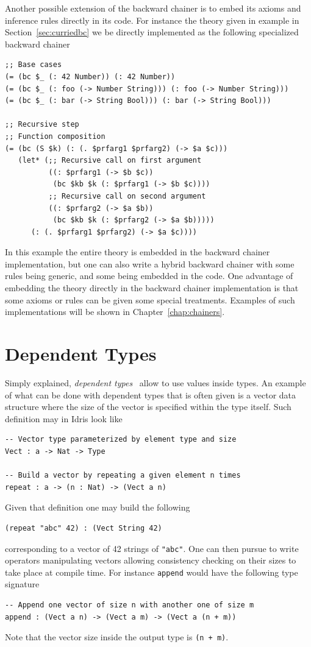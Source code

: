 \documentclass[]{report}
\begin{document}
Another possible extension of the backward chainer is to embed its
axioms and inference rules directly in its code.  For instance the
theory given in example in Section~\ref{sec:curriedbc} we be directly
implemented as the following specialized backward chainer

\begin{verbatim}
;; Base cases
(= (bc $_ (: 42 Number)) (: 42 Number))
(= (bc $_ (: foo (-> Number String))) (: foo (-> Number String)))
(= (bc $_ (: bar (-> String Bool))) (: bar (-> String Bool)))

;; Recursive step
;; Function composition
(= (bc (S $k) (: (. $prfarg1 $prfarg2) (-> $a $c)))
   (let* (;; Recursive call on first argument
          ((: $prfarg1 (-> $b $c))
           (bc $kb $k (: $prfarg1 (-> $b $c))))
          ;; Recursive call on second argument
          ((: $prfarg2 (-> $a $b))
           (bc $kb $k (: $prfarg2 (-> $a $b)))))
      (: (. $prfarg1 $prfarg2) (-> $a $c))))
\end{verbatim}
In this example the entire theory is embedded in the backward chainer
implementation, but one can also write a hybrid backward chainer with
some rules being generic, and some being embedded in the code.  One
advantage of embedding the theory directly in the backward chainer
implementation is that some axioms or rules can be given some special
treatments.  Examples of such implementations will be shown in
Chapter~\ref{chap:chainers}.

\section{Dependent Types}

Simply explained, \emph{dependent types}~\cite{MartinLof1980} allow to
use values inside types.  An example of what can be done with
dependent types that is often given is a vector data structure where
the size of the vector is specified within the type itself.  Such
definition may in Idris look like
\begin{verbatim}
-- Vector type parameterized by element type and size
Vect : a -> Nat -> Type

-- Build a vector by repeating a given element n times
repeat : a -> (n : Nat) -> (Vect a n)
\end{verbatim}
Given that definition one may build the following
\begin{verbatim}
(repeat "abc" 42) : (Vect String 42)
\end{verbatim}
corresponding to a vector of 42 strings of \texttt{"abc"}.
One can then pursue to write operators manipulating vectors allowing
consistency checking on their sizes to take place at compile time.
For instance \texttt{append} would have the following type
signature
\begin{verbatim}
-- Append one vector of size n with another one of size m
append : (Vect a n) -> (Vect a m) -> (Vect a (n + m))
\end{verbatim}
Note that the vector size inside the output type is
\texttt{(n + m)}.\\
\end{document}
